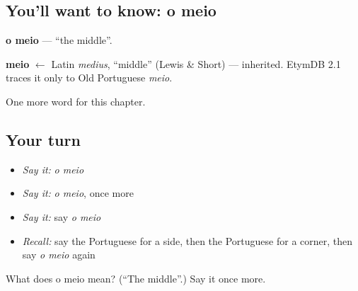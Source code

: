 \subsection*{You'll want to know: o meio}
\textbf{o meio} — \textquotedblleft{}the middle\textquotedblright{}.

\begin{cousinweb}
\textbf{meio} $\leftarrow$ Latin \emph{medius}, \textquotedblleft{}middle\textquotedblright{} (Lewis \& Short) — inherited. EtymDB 2.1 traces it only to Old Portuguese \emph{meio}.
\end{cousinweb}

\begin{grammarlens}[title={What you've built}]
One more word for this chapter.
\end{grammarlens}

\subsection*{Your turn}
\begin{itemize}
\raggedright
  \item \emph{Say it:} \emph{o meio}
  \item \emph{Say it:} \emph{o meio}, once more
  \item \emph{Say it:} say \emph{o meio}
  \item \emph{Recall:} say the Portuguese for a side, then the Portuguese for a corner, then say \emph{o meio} again
\end{itemize}

\begin{tcolorbox}[breakable,colback=teal!4,colframe=teal!35!black,title={Before you move on}]
What does o meio mean? (\textquotedblleft{}The middle\textquotedblright{}.) Say it once more.
\end{tcolorbox}
